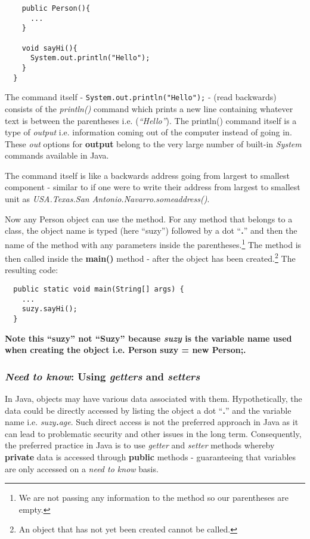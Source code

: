 \documentclass{article}
\begin{document}
\begin{flushleft}
\begin{verbatim}
    public Person(){
      ...
    }
     
    void sayHi(){
      System.out.println("Hello");
    }
  }
\end{verbatim}

The command itself - \texttt{System.out.println("Hello");} - (read backwards) consists of the \emph{println()} command which prints a new line containing whatever text is between the parentheses i.e. (\emph{``Hello''}). The println() command itself is a type of \emph{output} i.e. information coming out of the computer instead of going in. These \emph{out} options for \textbf{output} belong to the very large number of built-in \emph{System} commands available in Java.\par
The command itself is like a backwards address going from largest to smallest component - similar to if one were to write their address from largest to smallest unit as \emph{USA.Texas.San Antonio.Navarro.someaddress()}.\par
Now any Person object can use the method. For any method that belongs to a class, the object name is typed (here ``suzy'') followed by a dot ``\textbf{.}'' and then the name of the method with any parameters inside the parentheses.\footnote{We are not passing any information to the method so our parentheses are empty.} The method is then called inside the \textbf{main()} method - after the object has been created.\footnote{An object that has not yet been created cannot be called.} The resulting code:
\begin{verbatim}
  public static void main(String[] args) {
    ...
    suzy.sayHi();
  }
\end{verbatim}

\textbf{Note this ``\textbf{s}uzy'' not ``\textbf{S}uzy'' because \emph{suzy} is the variable name used when creating the object i.e. Person suzy = new Person;.}


\subsubsection{\textit{Need to know}: Using \emph{getters} and \emph{setters}
}
In Java, objects may have various data associated with them. Hypothetically, the data could be directly accessed by listing the object a dot ``\textbf{.}'' and the variable name i.e. \emph{suzy\textbf{.}age}. Such direct access is not the preferred approach in Java as it can lead to problematic security and other issues in the long term. Consequently, the preferred practice in Java is to use \emph{getter} and \emph{setter} methods whereby \textbf{private} data is accessed through \textbf{public} methods - guaranteeing that variables are only accessed on a \emph{need to know} basis.\par

\end{flushleft}
\end{document}

